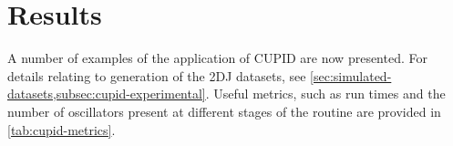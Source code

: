 \section{Results}
\label{subsec:cupid-results}

A number of examples of the application of \ac{CUPID} are now presented.
For details relating to generation of the \ac{2DJ} datasets, see
\cref{sec:simulated-datasets,subsec:cupid-experimental}. Useful
metrics, such as run times and the number of oscillators present at different
stages of the routine are provided in \cref{tab:cupid-metrics}.

